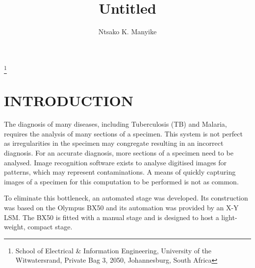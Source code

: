 \documentclass[10pt,twocolumn]{witseiepaper}
\begin{document}
\title{Untitled}

\author{Ntsako K. Manyike}

\thanks{School of Electrical \& Information Engineering, University of the
Witwatersrand, Private Bag 3, 2050, Johannesburg, South Africa}



%



\maketitle
\thispagestyle{empty}\pagestyle{empty}


%
\section{INTRODUCTION}

The diagnosis of many diseases, including Tuberculosis (TB) and Malaria,
requires the analysis of many sections of a specimen.  This system is not
perfect as irregularities in the specimen may congregate resulting in an
incorrect diagnosis.  For an accurate diagnosis, more sections of a specimen
need to be analysed.  Image recognition software exists to analyse digitised
images for patterns, which may represent contaminations.  A means of quickly
capturing images of a specimen for this computation to be performed is not as
common.  

To eliminate this bottleneck, an automated stage was developed.  Its
construction was based on the Olympus BX50 \cite{Olympus} and its automation
was provided by an X-Y LSM.  The BX50 is fitted with a manual stage and is
designed to host a light-weight, compact stage.
\end{document}
